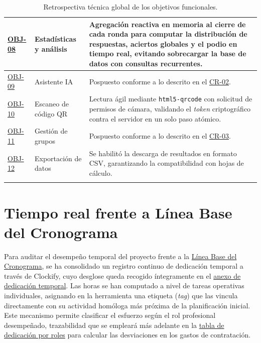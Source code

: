 \begin{table}[H]
{\begin{tabularx}{1.1\textwidth}{l P{2.5cm} Y}
      \hline
      \hyperref[obj:08]{OBJ-08} & Estadísticas y análisis & Agregación reactiva en memoria al cierre de cada ronda para computar la distribución de respuestas, aciertos globales y el podio en tiempo real, evitando sobrecargar la base de datos con consultas recurrentes. \\
      \hline
      \hyperref[obj:09]{OBJ-09} & Asistente IA & Pospuesto conforme a lo descrito en el \hyperref[tab:cr_02_ia]{CR-02}. \\
      \hline
      \hyperref[obj:10]{OBJ-10} & Escaneo de código QR & Lectura ágil mediante \texttt{html5-qrcode} con solicitud de permisos de cámara, validando el \textit{token} criptográfico contra el servidor en un solo paso atómico. \\
      \hline
      \hyperref[obj:11]{OBJ-11} & Gestión de grupos & Pospuesto conforme a lo descrito en el \hyperref[tab:cr_03_grupos]{CR-03}. \\
      \hline
      \hyperref[obj:12]{OBJ-12} & Exportación de datos & Se habilitó la descarga de resultados en formato CSV, garantizando la compatibilidad con hojas de cálculo. \\
      \bighline
    \end{tabularx}%
  }
  \caption{Retrospectiva técnica global de los objetivos funcionales.}
  \label{tab:objetivos_retrospectiva_global}
\end{table}

\section{Tiempo real frente a Línea Base del Cronograma}\label{sec:tiempo_real_vs_cronograma}

Para auditar el desempeño temporal del proyecto frente a la \hyperref[sec:linea_base_del_cronograma]{Línea Base del Cronograma}, se ha consolidado un registro continuo de dedicación temporal a través de Clockify, cuyo desglose queda recogido íntegramente en el \hyperref[anexo:clockify]{anexo de dedicación temporal}. Las horas se han computado a nivel de tareas operativas individuales, asignando en la herramienta una etiqueta (\textit{tag}) que las vincula directamente con su actividad homóloga más próxima de la planificación inicial. Este mecanismo permite clasificar el esfuerzo según el rol profesional desempeñado, trazabilidad que se empleará más adelante en la \hyperref[tab:horas_roles_previstas_reales]{tabla de dedicación por roles} para calcular las desviaciones en los gastos de contratación.

